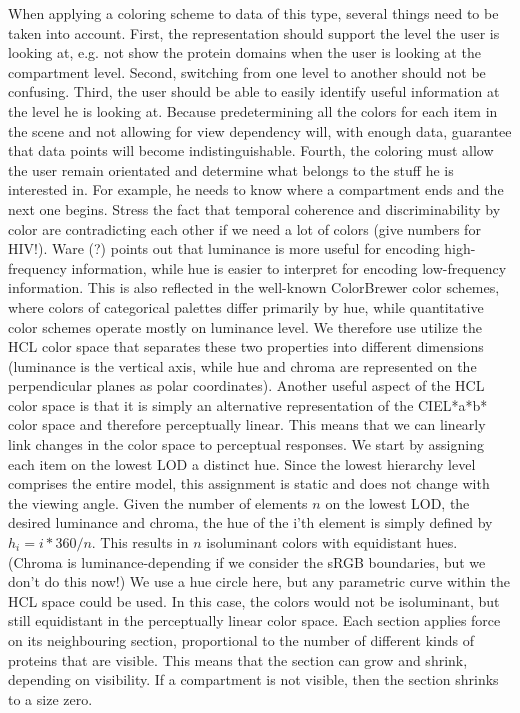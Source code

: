 \documentclass[review,journal]{vgtc}         %
\begin{document}
When applying a coloring scheme to data of this type, several things need to be taken into account. First, the representation should support the level the user is looking at, e.g. not show the protein domains when the user is looking at the compartment level. Second, switching from one level to another should not be confusing. Third, the user should be able to easily identify useful information at the level he is looking at. Because predetermining all the colors for each item in the scene and not allowing for view dependency will, with enough data, guarantee that data points will become indistinguishable. Fourth, the coloring must allow the user remain orientated and determine what belongs to the stuff he is interested in. For example, he needs to know where a compartment ends and the next one begins.
Stress the fact that temporal coherence and discriminability by color are contradicting each other if we need a lot of colors (give numbers for HIV!). 
Ware (?) points out that luminance is more useful for encoding high-frequency information, while hue is easier to interpret for encoding low-frequency information. This is also reflected in the well-known ColorBrewer color schemes, where colors of categorical palettes differ primarily by hue, while quantitative color schemes operate mostly on luminance level.  We therefore use utilize the HCL color space that separates these two properties into different dimensions (luminance is the vertical axis, while hue and chroma are represented on the perpendicular planes as polar coordinates). Another useful aspect of the HCL color space is that it is simply an alternative representation of the CIEL*a*b* color space and therefore perceptually linear. This means that we can linearly link changes in the color space to perceptual responses. 
We start by assigning each item on the lowest LOD a distinct hue. Since the lowest hierarchy level comprises the entire model, this assignment is static and does not change with the viewing angle. Given the number of elements $n$ on the lowest LOD, the desired luminance and chroma, the hue of the i’th element is simply defined by $h_i=i*360/n$. This results in $n$ isoluminant colors with equidistant hues. 
(Chroma is luminance-depending if we consider the sRGB boundaries, but we don’t do this now!)
We use a hue circle here, but any parametric curve within the HCL space could be used. In this case, the colors would not be isoluminant, but still equidistant in the perceptually linear color space. 
Each section applies force on its neighbouring section, proportional to the number of different kinds of proteins that are visible. This means that the section can grow and shrink, depending on visibility. If a compartment is not visible, then the section shrinks to a size zero. 
\end{document}
